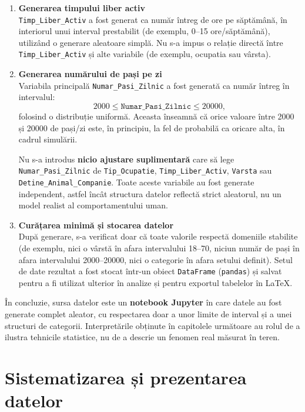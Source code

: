 \documentclass[12pt,a4paper]{report}
\begin{document}
\begin{enumerate}[leftmargin=1.2cm,label=\arabic*.]
  \item \textbf{Generarea timpului liber activ}\\
  \texttt{Timp\_Liber\_Activ} a fost generat ca număr întreg de ore pe săptămână, în interiorul unui interval prestabilit (de exemplu, 0–15 ore/săptămână), utilizând o generare aleatoare simplă. Nu s-a impus o relație directă între \texttt{Timp\_Liber\_Activ} și alte variabile (de exemplu, ocupatia sau vârsta).

  \item \textbf{Generarea numărului de pași pe zi}\\
  Variabila principală \texttt{Numar\_Pasi\_Zilnic} a fost generată ca număr întreg în intervalul:
  \[
  2000 \leq \texttt{Numar\_Pasi\_Zilnic} \leq 20000,
  \]
  folosind o distribuție uniformă. Aceasta înseamnă că orice valoare între 2000 și 20000 de pași/zi este, în principiu, la fel de probabilă ca oricare alta, în cadrul simulării.

  Nu s-a introdus \textbf{nicio ajustare suplimentară} care să lege \texttt{Numar\_Pasi\_Zilnic} de \texttt{Tip\_Ocupatie}, \texttt{Timp\_Liber\_Activ}, \texttt{Varsta} sau \texttt{Detine\_Animal\_Companie}. Toate aceste variabile au fost generate independent, astfel încât structura datelor reflectă strict aleatorul, nu un model realist al comportamentului uman.

  \item \textbf{Curățarea minimă și stocarea datelor}\\
  După generare, s-a verificat doar că toate valorile respectă domeniile stabilite (de exemplu, nici o vârstă în afara intervalului 18–70, niciun număr de pași în afara intervalului 2000–20000, nici o categorie în afara setului definit). Setul de date rezultat a fost stocat într-un obiect \texttt{DataFrame} (\texttt{pandas}) și salvat pentru a fi utilizat ulterior în analize și pentru exportul tabelelor în LaTeX.
\end{enumerate}

În concluzie, sursa datelor este un \textbf{notebook Jupyter} în care datele au fost generate complet aleator, cu respectarea doar a unor limite de interval și a unei structuri de categorii. Interpretările obținute în capitolele următoare au rolul de a ilustra tehnicile statistice, nu de a descrie un fenomen real măsurat în teren.

\section{Sistematizarea și prezentarea datelor}
\end{document}
